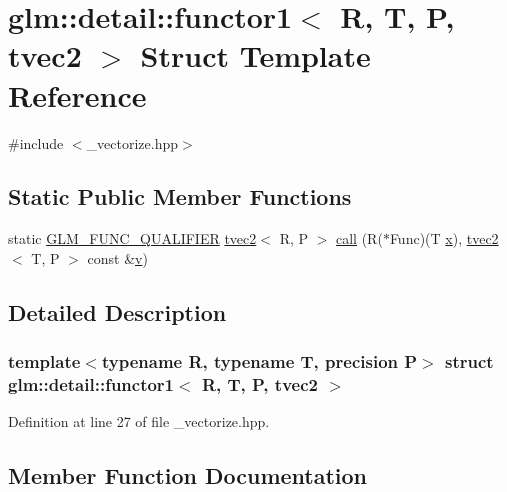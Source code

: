 \hypertarget{structglm_1_1detail_1_1functor1_3_01_r_00_01_t_00_01_p_00_01tvec2_01_4}{}\section{glm\+::detail\+::functor1$<$ R, T, P, tvec2 $>$ Struct Template Reference}
\label{structglm_1_1detail_1_1functor1_3_01_r_00_01_t_00_01_p_00_01tvec2_01_4}


{\ttfamily \#include $<$\+\_\+vectorize.\+hpp$>$}

\subsection*{Static Public Member Functions}
\begin{DoxyCompactItemize}
\item 
static \mbox{\hyperlink{setup_8hpp_a33fdea6f91c5f834105f7415e2a64407}{G\+L\+M\+\_\+\+F\+U\+N\+C\+\_\+\+Q\+U\+A\+L\+I\+F\+I\+ER}} \mbox{\hyperlink{structglm_1_1tvec2}{tvec2}}$<$ R, P $>$ \mbox{\hyperlink{structglm_1_1detail_1_1functor1_3_01_r_00_01_t_00_01_p_00_01tvec2_01_4_aaabd54c114db7c12681014fcbcf763bf}{call}} (R($\ast$Func)(T \mbox{\hyperlink{glad_8h_a92d0386e5c19fb81ea88c9f99644ab1d}{x}}), \mbox{\hyperlink{structglm_1_1tvec2}{tvec2}}$<$ T, P $>$ const \&\mbox{\hyperlink{glad_8h_a14cfbe2fc2234f5504618905b69d1e06}{v}})
\end{DoxyCompactItemize}


\subsection{Detailed Description}
\subsubsection*{template$<$typename R, typename T, precision P$>$\newline
struct glm\+::detail\+::functor1$<$ R, T, P, tvec2 $>$}



Definition at line 27 of file \+\_\+vectorize.\+hpp.



\subsection{Member Function Documentation}
\mbox{\label{structglm_1_1detail_1_1functor1_3_01_r_00_01_t_00_01_p_00_01tvec2_01_4_aaabd54c114db7c12681014fcbcf763bf}} 
